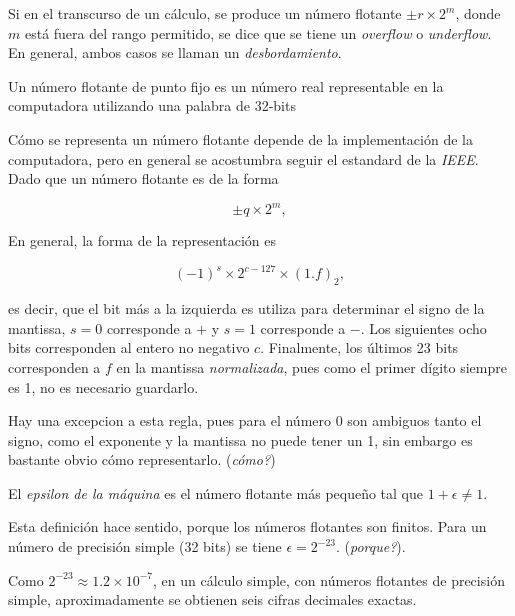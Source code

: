 \begin{definition}
Si en el transcurso de un cálculo, se produce un número flotante $\pm r \times 2^m$, donde $m$ está fuera del rango permitido, se dice que se tiene un \emph{overflow} o \emph{underflow}. En general, ambos casos se llaman un \emph{desbordamiento}.  
\end{definition}

\begin{definition}
  Un número flotante de punto fijo es un número real representable en la computadora utilizando una palabra de 32-bits
\end{definition}

Cómo se representa un número flotante depende de la implementación de la computadora, pero en general se acostumbra seguir el estandard de la \emph{IEEE}. Dado que un  número flotante es de la forma

\[\pm q \times 2^m,\]

En general, la forma de la representación es 

\[(-1)^s \times 2^{c - 127} \times (1.f)_2,\]

es decir, que el bit más a la izquierda es utiliza para determinar el signo de la mantissa, $s = 0$ corresponde a $+$ y $s = 1$ corresponde a $-$. Los siguientes ocho bits corresponden al entero  no negativo $c$. Finalmente, los últimos 23 bits corresponden a $f$ en la mantissa \emph{normalizada}, pues como el primer dígito siempre es 1, no es necesario guardarlo.

\begin{remark}
  Hay una excepcion a esta regla, pues para el número 0 son ambiguos tanto el signo, como el exponente y la mantissa no puede tener un 1, sin embargo es bastante obvio cómo representarlo. (\emph{cómo?})
\end{remark}

\begin{definition}
  El \emph{epsilon de la máquina} es el número flotante más pequeño tal que $1 + \epsilon \neq 1$.
\end{definition}

Esta definición hace sentido, porque los números flotantes son finitos. Para un número de precisión simple (32 bits) se tiene $\epsilon = 2^{-23}$. (\emph{porque?}).

\begin{remark}
  Como $2^{-23} \approx 1.2 \times 10^{-7}$, en un cálculo simple, con números flotantes de precisión simple, aproximadamente se obtienen seis cifras decimales exactas.
\end{remark}

